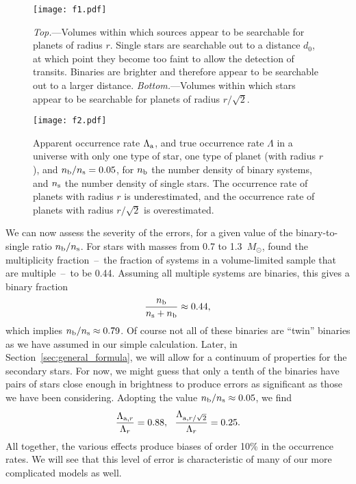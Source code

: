 \documentclass[12pt,modern,trackchanges]{aastex61}
\renewcommand{\a}{_{\rm a}}
\newcommand{\s}{_{\rm s}}
\renewcommand{\b}{_{\rm b}}
\begin{document}
\begin{figure}[!tb]
    \begin{center}
        \texttt{[image: f1.pdf]}
    \end{center}
    \caption{ {\it Top.}---Volumes within which sources appear to be
    searchable for planets of radius $r$.  Single stars are searchable
    out to a distance $d_0$, at which point they become too faint to
    allow the detection of transits.  Binaries are brighter and
    therefore appear to be searchable out to a larger distance.  {\it
    Bottom.}---Volumes within which stars appear to be searchable for
    planets of radius $r/\sqrt{2}$.  }
    \label{fig:model_1_volumes}
\end{figure}

\begin{figure}[!tb]
    \begin{center}
        \texttt{[image: f2.pdf]}
    \end{center}
    \vspace{-0.5cm}
    \caption{ Apparent occurrence rate $\Lambda\a$, and true
    occurrence rate $\Lambda$ in a universe with only one type of
    star, one type of planet (with radius $r$), and $n\b/n\s=0.05$,
    for $n\b$ the number density of binary systems, and $n\s$ the
    number density of single stars.  The occurrence rate of planets
    with radius $r$ is underestimated, and the occurrence rate of
    planets with radius $r/\sqrt{2}$ is overestimated.}
    \label{fig:occ_rate_model_1}
\end{figure}

We can now assess the severity of the errors, for a given value of the
binary-to-single ratio $n\b/n\s$. For stars with masses from 0.7 to
1.3~$M_\odot$, \citet{raghavan_survey_2010} found the multiplicity
fraction~--~the fraction of systems in a volume-limited sample that
are multiple~--~to be 0.44.  Assuming all multiple systems are
binaries, this gives a binary fraction
\begin{equation}
  \frac{n\b}{n\s + n\b} \approx 0.44,
\end{equation}
which implies $n\b/n\s \approx 0.79$.  Of course not all of these
binaries are ``twin'' binaries as we have assumed in our simple
calculation.  Later, in Section~\ref{sec:general_formula}, we will
allow for a continuum of properties for the secondary stars. For now,
we might guess that only a tenth of the binaries have pairs of stars
close enough in brightness to produce errors as significant as those
we have been considering.  Adopting the value $n\b/n\s\approx0.05$, we
find
\begin{equation}
    \frac{\Lambda_{{\rm{a}},r}}{\Lambda_r} = 0.88,~~
    \frac{\Lambda_{{\rm{a}},r/\sqrt{2}}}{\Lambda_r} = 0.25.
    \label{eq:ratios}
\end{equation}
All together, the various effects produce biases of order 10\% in the
occurrence rates.  We will see that this level of error is
characteristic of many of our more complicated models as well.
\end{document}
